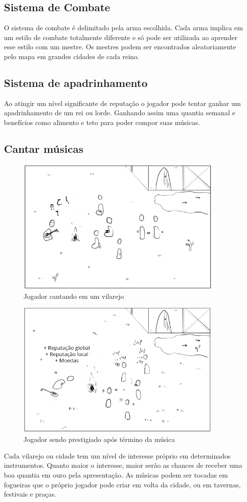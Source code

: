 \documentclass[12pt, 
openright, 
oneside, 
a4paper,    
brazil]{facom-ufu-abntex2}
\begin{document}
\subsection{Sistema de Combate}
O sistema de combate é delimitado pela arma escolhida. Cada arma implica em um estilo
de combate totalmente diferente e só pode ser utilizada ao aprender esse estilo com um
mestre. Os mestres podem ser encontrados aleatoriamente pelo mapa em grandes cidades de 
cada reino.

\subsection{Sistema de apadrinhamento}
Ao atingir um nível significante de reputação o jogador pode tentar ganhar um apadrinhamento de um rei ou lorde. Ganhando assim uma quantia semanal e benefícios como alimento e teto para poder compor suas músicas.

\subsection{Cantar músicas}
\begin{figure}[H]
	\centering
	\includegraphics[width=4in]{imagens/mecanica_cantar.png}
	\caption{Jogador cantando em um vilarejo}
\end{figure}
\begin{figure}[H]
	\centering
	\includegraphics[width=4in]{imagens/mecanica_cantar2.png}
	\caption{Jogador sendo prestigiado após término da música}
\end{figure}
Cada vilarejo ou cidade tem um nível de interesse próprio em determinados instrumentos.
Quanto maior o interesse, maior serão as chances de receber uma boa quantia em ouro
pela apresentação.
As músicas podem ser tocadas em fogueiras que o próprio jogador pode criar em volta da cidade, ou em tavernas, festivais e praças.
\end{document}
